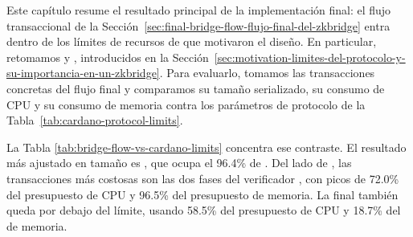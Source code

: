 
Este capítulo resume el resultado principal de la implementación final: el flujo transaccional de la Sección~\ref{sec:final-bridge-flow-flujo-final-del-zkbridge} entra dentro de los límites de recursos de \Cardano que motivaron el diseño. En particular, retomamos \maxTxSize y \maxTxExUnits, introducidos en la Sección~\ref{sec:motivation-limites-del-protocolo-y-su-importancia-en-un-zkbridge}. Para evaluarlo, tomamos las transacciones concretas del flujo final y comparamos su tamaño serializado, su consumo de CPU y su consumo de memoria contra los parámetros de protocolo de la Tabla~\ref{tab:cardano-protocol-limits}.

La Tabla \ref{tab:bridge-flow-vs-cardano-limits} concentra ese contraste. El resultado más ajustado en tamaño es \PublishPhaseOneReferenceScriptTx, que ocupa el 96.4\% de \maxTxSize. Del lado de \ExUnits, las transacciones más costosas son las dos fases del verificador \STM, con picos de 72.0\% del presupuesto de CPU y 96.5\% del presupuesto de memoria. La \BridgeMintTxTemplate final también queda por debajo del límite, usando 58.5\% del presupuesto de CPU y 18.7\% del de memoria.


